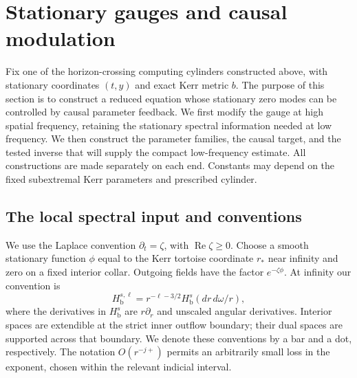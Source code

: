 \section{Stationary gauges and causal modulation}\label{sec:stationary}

Fix one of the horizon-crossing computing cylinders constructed above,
with stationary coordinates $(t,y)$ and exact Kerr metric $b$.
The purpose of this section is to construct a reduced equation whose
stationary zero modes can be controlled by causal parameter feedback.
We first modify the gauge at high spatial frequency, retaining the
stationary spectral information needed at low frequency.  We then
construct the parameter families, the causal target, and the tested
inverse that will supply the compact low-frequency estimate.
All constructions are made separately on each end.  Constants may
depend on the fixed subextremal Kerr parameters and prescribed cylinder.

\subsection{The local spectral input and conventions}

We use the Laplace convention $\partial_t=\zeta$, with
$\operatorname{Re}\zeta\geq0$.  Choose a smooth stationary function
$\phi$ equal to the Kerr tortoise coordinate $r_*$ near infinity and
zero on a fixed interior collar.  Outgoing fields have the factor
$e^{-\zeta\phi}$.  At infinity our convention is
\begin{equation}\label{st:b-weights}
 H_{\mathrm b}^{s,\ell}
 =r^{-\ell-3/2}H_{\mathrm b}^{s}(dr\,d\omega/r),
\end{equation}
where the derivatives in $H_{\mathrm b}^{s}$ are $r\partial_r$ and
unscaled angular derivatives.  Interior spaces are extendible at the
strict inner outflow boundary; their dual spaces are supported across
that boundary.  We denote these conventions by a bar and a dot,
respectively.  The notation $O(r^{-j+})$ permits an arbitrarily small
loss in the exponent, chosen within the relevant indicial interval.

